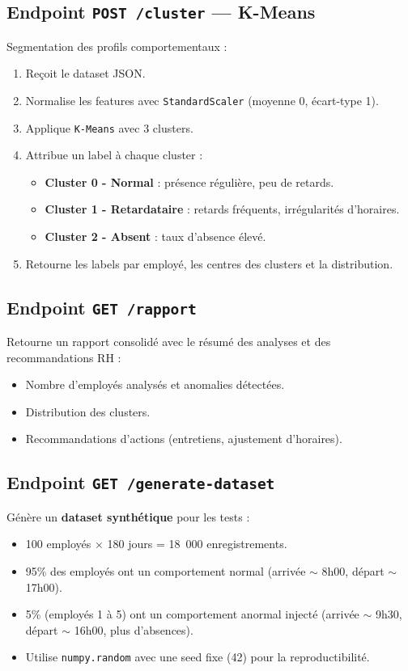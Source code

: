\documentclass[a4paper,12pt]{report}
\begin{document}
\subsection{Endpoint \texttt{POST /cluster} --- K-Means}
Segmentation des profils comportementaux :
\begin{enumerate}
  \item Reçoit le dataset JSON.
  \item Normalise les features avec \texttt{StandardScaler} (moyenne 0, écart-type 1).
  \item Applique \texttt{K-Means} avec 3 clusters.
  \item Attribue un label à chaque cluster :
  \begin{itemize}
    \item \textbf{Cluster 0 - Normal} : présence régulière, peu de retards.
    \item \textbf{Cluster 1 - Retardataire} : retards fréquents, irrégularités d'horaires.
    \item \textbf{Cluster 2 - Absent} : taux d'absence élevé.
  \end{itemize}
  \item Retourne les labels par employé, les centres des clusters et la distribution.
\end{enumerate}

\subsection{Endpoint \texttt{GET /rapport}}
Retourne un rapport consolidé avec le résumé des analyses et des recommandations RH :
\begin{itemize}
  \item Nombre d'employés analysés et anomalies détectées.
  \item Distribution des clusters.
  \item Recommandations d'actions (entretiens, ajustement d'horaires).
\end{itemize}

\subsection{Endpoint \texttt{GET /generate-dataset}}
Génère un \textbf{dataset synthétique} pour les tests :
\begin{itemize}
  \item 100 employés $\times$ 180 jours = 18~000 enregistrements.
  \item 95\% des employés ont un comportement normal (arrivée $\sim$ 8h00, départ $\sim$ 17h00).
  \item 5\% (employés 1 à 5) ont un comportement anormal injecté (arrivée $\sim$ 9h30, départ $\sim$ 16h00, plus d'absences).
  \item Utilise \texttt{numpy.random} avec une seed fixe (42) pour la reproductibilité.
\end{itemize}
\end{document}
